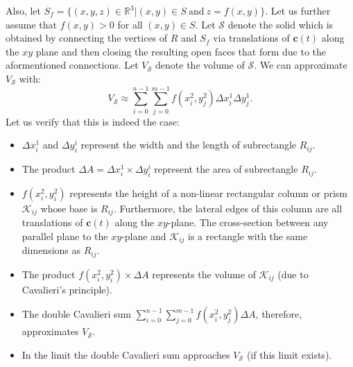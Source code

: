 \documentclass{article}
\theoremstyle{theorem}
\theoremstyle{definition}
\begin{document}

\noindent
Also, let $S_f = \{(x,y,z)\in\mathbb{R}^3|(x,y)\in S ~ \textrm{and} ~ z=f(x,y)\}$.  Let us further assume that $f(x,y) > 0$ for all $(x,y)\in S$. Let $\mathcal{S}$ denote the solid which is obtained by connecting the vertices of $R$ and 
$S_f$ via translations of $\mathbf{c}(t)$ along the $xy$ plane and then closing the resulting open faces that form due to the aformentioned connections. Let $V_{\mathcal{S}}$ denote the volume of $\mathcal{S}$. We can approximate $V_{\mathcal{S}}$ with:
\begin{equation}
V_{\mathcal{S}} \approx \sum_{i=0}^{n-1} \sum_{j=0}^{m-1} f(x_i^2,y_j^2) \Delta x_i^1 \Delta y_j^1.
\end{equation}
Let us verify that this is indeed the case:
\begin{itemize}
\item $\Delta x_i^1$ and $\Delta y_i^i$ represent the width and the length of subrectangle $R_{ij}$.
\item The product $\Delta A = \Delta x_i^1\times \Delta y_i^i$ represent the area of subrectangle $R_{ij}$.
\item $f(x_i^2,y_i^2)$ represents the height of a non-linear rectangular column or prism $\mathcal{K}_{ij}$ whose base is $R_{ij}$. Furthermore, the lateral edges of this column are all translations 
of $\mathbf{c}(t)$ along the $xy$-plane. The cross-section between any parallel plane to the $xy$-plane and $\mathcal{K}_{ij}$ is a rectangle with the same dimensions as $R_{ij}$. 
\item The product $f(x_i^2,y_i^2)\times \Delta A$ represents the volume of $\mathcal{K}_{ij}$ (due to Cavalieri's principle).
\item The double Cavalieri sum $\sum_{i=0}^{n-1} \sum_{j=0}^{m-1} f(x_i^2,y_j^2) \Delta A$, therefore, approximates $V_{\mathcal{S}}$. 
\item In the limit the double Cavalieri sum approaches $V_{\mathcal{S}}$ (if this limit exists). 
\end{itemize}
\end{document}

